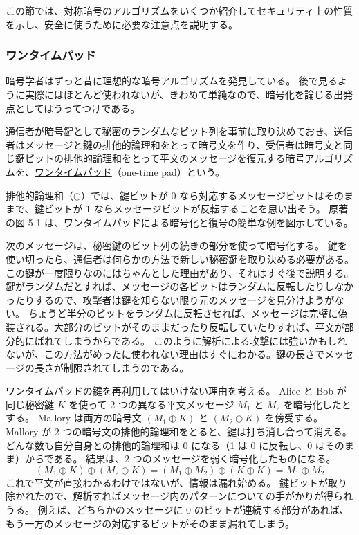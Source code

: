 \documentclass[uplatex]{jsarticle}
\def\label#1{}%
\begin{document}
この節では、対称暗号のアルゴリズムをいくつか紹介してセキュリティ上の性質を示し、安全に使うために必要な注意点を説明する。

\subsubsection{ワンタイムパッド}

暗号学者はずっと昔に理想的な暗号アルゴリズムを発見している。
後で見るように実際にはほとんど使われないが、きわめて単純なので、暗号化を論じる出発点としてはうってつけである。

\begin{dfn}[ワンタイムパッド]\label{dfn:ch5-one-time-pad}
通信者が暗号鍵として秘密のランダムなビット列を事前に取り決めておき、送信者はメッセージと鍵の排他的論理和をとって暗号文を作り、受信者は暗号文と同じ鍵ビットの排他的論理和をとって平文のメッセージを復元する暗号アルゴリズムを、\underline{ワンタイムパッド}（one-time pad）という。
\end{dfn}

排他的論理和（$\oplus$）では、鍵ビットが 0 なら対応するメッセージビットはそのままで、鍵ビットが 1 ならメッセージビットが反転することを思い出そう。
原著の図 5-1 は、ワンタイムパッドによる暗号化と復号の簡単な例を図示している。

次のメッセージは、秘密鍵のビット列の続きの部分を使って暗号化する。
鍵を使い切ったら、通信者は何らかの方法で新しい秘密鍵を取り決める必要がある。
この鍵が一度限りなのにはちゃんとした理由があり、それはすぐ後で説明する。
鍵がランダムだとすれば、メッセージの各ビットはランダムに反転したりしなかったりするので、攻撃者は鍵を知らない限り元のメッセージを見分けようがない。
ちょうど半分のビットをランダムに反転させれば、メッセージは完璧に偽装される。大部分のビットがそのままだったり反転していたりすれば、平文が部分的にばれてしまうからである。
このように解析による攻撃には強いかもしれないが、この方法がめったに使われない理由はすぐにわかる。鍵の長さでメッセージの長さが制限されてしまうのである。

\begin{exa}[ワンタイムパッドの鍵の再利用]\label{exa:ch5-otp-key-reuse}
ワンタイムパッドの鍵を再利用してはいけない理由を考える。
Alice と Bob が同じ秘密鍵 $K$ を使って 2 つの異なる平文メッセージ $M_1$ と $M_2$ を暗号化したとする。
Mallory は両方の暗号文 $(M_1 \oplus K)$ と $(M_2 \oplus K)$ を傍受する。
Mallory が 2 つの暗号文の排他的論理和をとると、鍵は打ち消し合って消える。
どんな数も自分自身との排他的論理和は 0 になる（1 は 0 に反転し、0 はそのまま）からである。
結果は、2 つのメッセージを弱く暗号化したものになる。
\[
(M_1 \oplus K) \oplus (M_2 \oplus K) = (M_1 \oplus M_2) \oplus (K \oplus K) = M_1 \oplus M_2
\]
これで平文が直接わかるわけではないが、情報は漏れ始める。
鍵ビットが取り除かれたので、解析すればメッセージ内のパターンについての手がかりが得られうる。
例えば、どちらかのメッセージに 0 のビットが連続する部分があれば、もう一方のメッセージの対応するビットがそのまま漏れてしまう。
\end{exa}
\end{document}
